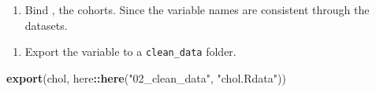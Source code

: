 \documentclass[]{book}
\newenvironment{Shaded}{\begin{snugshade}}{\end{snugshade}}
\newcommand{\KeywordTok}[1]{\textcolor[rgb]{0.13,0.29,0.53}{\textbf{#1}}}
\newcommand{\NormalTok}[1]{#1}
\newcommand{\OperatorTok}[1]{\textcolor[rgb]{0.81,0.36,0.00}{\textbf{#1}}}
\newcommand{\StringTok}[1]{\textcolor[rgb]{0.31,0.60,0.02}{#1}}
\providecommand{\tightlist}{%
  \setlength{\itemsep}{0pt}\setlength{\parskip}{0pt}}
\begin{document}
\begin{enumerate}
\def\labelenumi{\arabic{enumi}.}
\setcounter{enumi}{4}
\tightlist
\item
  Bind , the cohorts. Since the variable names are consistent through the datasets.
\end{enumerate}

\begin{Shaded}
\end{Shaded}

\begin{enumerate}
\def\labelenumi{\arabic{enumi}.}
\setcounter{enumi}{5}
\tightlist
\item
  Export the variable to a \texttt{clean\_data} folder.
\end{enumerate}

\begin{Shaded}
\begin{Highlighting}[]
\KeywordTok{export}\NormalTok{(chol, here}\OperatorTok{::}\KeywordTok{here}\NormalTok{(}\StringTok{"02_clean_data"}\NormalTok{, }\StringTok{"chol.Rdata"}\NormalTok{))}
\end{Highlighting}
\end{Shaded}


\end{document}
